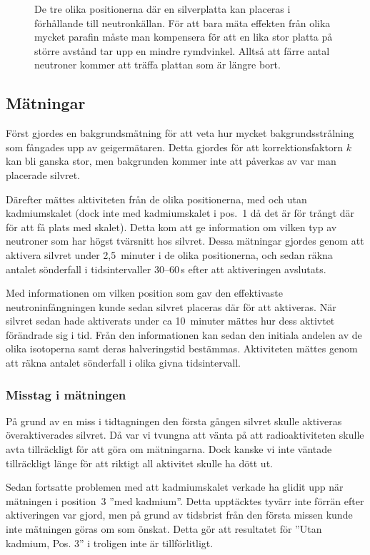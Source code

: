 \documentclass[11pt,a4paper, english, swedish
]{article}
\begin{document}
\begin{figure}\centering
\resizebox{.5\textwidth}{!}{}
\caption{De tre olika positionerna där en silverplatta kan placeras i förhållande till neutronkällan. 
För att bara mäta effekten från olika mycket parafin måste man kompensera för att en lika stor platta på större avstånd tar upp en mindre rymdvinkel. Alltså att färre antal neutroner kommer att träffa plattan som är längre bort.}
\label{fig:aktivering}
\end{figure}


\subsection{Mätningar}
Först gjordes en bakgrundsmätning för att veta hur mycket bakgrundsstrålning som fångades upp av geigermätaren. Detta gjordes för att korrektionsfaktorn $k$ kan bli ganska stor, men bakgrunden kommer inte att påverkas av var man placerade silvret. 

Därefter mättes aktiviteten från de olika positionerna, med och utan kadmiumskalet (dock inte med kadmiumskalet i pos.~1 då det är för trångt där för att få plats med skalet). Detta kom att ge information om vilken typ av neutroner som har högst tvärsnitt hos silvret. Dessa mätningar gjordes genom att aktivera silvret under 2,5~minuter i de olika positionerna, och sedan räkna antalet sönderfall i tidsintervaller 30--60\,s efter att aktiveringen avslutats. 

Med informationen om vilken position som gav den effektivaste neutroninfångningen kunde sedan silvret placeras där för att aktiveras. När silvret sedan hade aktiverats under ca 10~minuter mättes hur dess aktivtet förändrade sig i tid. Från den informationen kan sedan den initiala andelen av de olika isotoperna samt deras halveringstid bestämmas. Aktiviteten mättes genom att räkna antalet sönderfall i olika givna tidsintervall. 

\subsubsection{Misstag i mätningen}
På grund av en miss i tidtagningen den första gången silvret skulle aktiveras överaktiverades silvret. Då var vi tvungna att vänta på att radioaktiviteten skulle avta tillräckligt för att göra om mätningarna. Dock kanske vi inte väntade tillräckligt länge för att riktigt all aktivitet skulle ha dött ut.

Sedan fortsatte problemen med att kadmiumskalet verkade ha glidit upp när mätningen i position~3 ''med kadmium''. Detta upptäcktes tyvärr inte förrän efter aktiveringen var gjord, men på grund av tidsbrist från den första missen kunde inte mätningen göras om som önskat. Detta gör att resultatet för ''Utan kadmium, Pos. 3'' i  troligen inte är tillförlitligt. 
\end{document}
